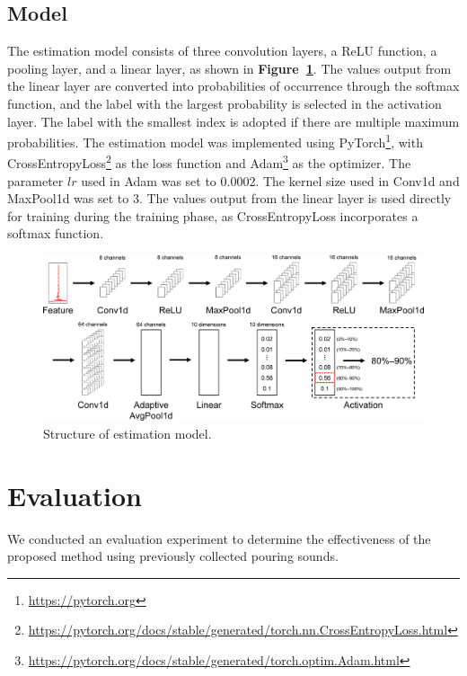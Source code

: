 \documentclass[manuscript,screen,anonymous,review]{acmart}
\newcommand\figref[1]{\textbf{Figure~\ref{fig:#1}}}
\begin{document}
\subsection{Model}
The estimation model consists of three convolution layers, a ReLU function, a pooling layer, and a linear layer, as shown in \figref{model}. The values output from the linear layer are converted into probabilities of occurrence through the softmax function, and the label with the largest probability is selected in the activation layer. The label with the smallest index is adopted if there are multiple maximum probabilities. The estimation model was implemented using PyTorch\footnote{\url{https://pytorch.org}}, with CrossEntropyLoss\footnote{\url{https://pytorch.org/docs/stable/generated/torch.nn.CrossEntropyLoss.html}} as the loss function and Adam\footnote{\url{https://pytorch.org/docs/stable/generated/torch.optim.Adam.html}} as the optimizer. The parameter $lr$ used in Adam was set to 0.0002. The kernel size used in Conv1d and MaxPool1d was set to 3. The values output from the linear layer is used directly for training during the training phase, as CrossEntropyLoss incorporates a softmax function.

\begin{figure}[!t]
  \centering
  \includegraphics[width=0.8\linewidth]{figures/model.eps}
  \caption{Structure of estimation model.}
  \label{fig:model}
\end{figure}



\section{Evaluation}
\label{sec:evaluation}
We conducted an evaluation experiment to determine the effectiveness of the proposed method using previously collected pouring sounds.

\end{document}
